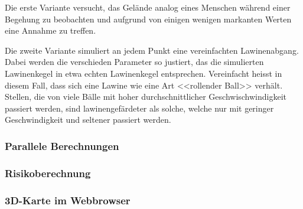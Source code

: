 Die erste Variante versucht, das Gelände analog eines Menschen während einer Begehung zu beobachten und aufgrund von einigen wenigen markanten Werten eine Annahme zu treffen.

Die zweite Variante simuliert an jedem Punkt eine vereinfachten Lawinenabgang. Dabei werden die verschieden Parameter so justiert, das die simulierten Lawinenkegel in etwa echten Lawinenkegel entsprechen. Vereinfacht heisst in diesem Fall, dass sich eine Lawine wie eine Art <<rollender Ball>> verhält. Stellen, die von viele Bälle mit hoher durchschnittlicher Geschwischwindigkeit passiert werden, sind lawinengefärdeter als solche, welche nur mit geringer Geschwindigkeit und seltener passiert werden.

\subsubsection{Parallele Berechnungen}
\subsubsection{Risikoberechnung}
\subsubsection{3D-Karte im Webbrowser}